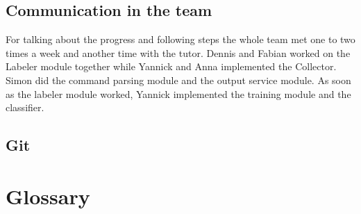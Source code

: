 \documentclass[parskip=full]{scrartcl}
\begin{document}
\subsection{Communication in the team}
For talking about the progress and following steps the whole team met one to two times a week and another time with the tutor.
Dennis and Fabian worked on the Labeler module together while Yannick and Anna implemented the Collector.
Simon did the command parsing module and the output service module.
As soon as the labeler module worked, Yannick implemented the training module and the classifier.
\subsection{Git}



\newpage
\section{Glossary}

%
\printnoidxglossaries
\end{document}
